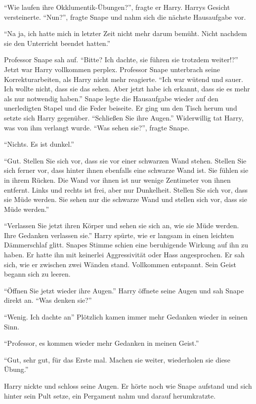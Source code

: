 \enquote{Wie laufen ihre Okklumentik-Übungen?}, fragte er Harry. Harrys Gesicht versteinerte. \enquote{Nun?}, fragte Snape und nahm sich die nächste Hausaufgabe vor.

\enquote{Na ja, ich hatte mich in letzter Zeit nicht mehr darum bemüht. Nicht nachdem sie den Unterricht beendet hatten.}

Professor Snape sah auf. \enquote{Bitte? Ich dachte, sie führen sie trotzdem weiter!?} Jetzt war Harry vollkommen perplex. Professor Snape unterbrach seine Korrekturarbeiten, als Harry nicht mehr reagierte. \enquote{Ich war wütend und sauer. Ich wollte nicht, dass sie das sehen. Aber jetzt habe ich erkannt, dass sie es mehr als nur notwendig haben.} Snape legte die Hausaufgabe wieder auf den unerledigten Stapel und die Feder beiseite. Er ging um den Tisch herum und setzte sich Harry gegenüber. \enquote{Schließen Sie ihre Augen.} Widerwillig tat Harry, was von ihm verlangt wurde. \enquote{Was sehen sie?}, fragte Snape.

\enquote{Nichts. Es ist dunkel.}

\enquote{Gut. Stellen Sie sich vor, dass sie vor einer schwarzen Wand stehen. Stellen Sie sich ferner vor, dass hinter ihnen ebenfalls eine schwarze Wand ist. Sie fühlen sie in ihrem Rücken. Die Wand vor ihnen ist nur wenige Zentimeter von ihnen entfernt. Links und rechts ist frei, aber nur Dunkelheit. Stellen Sie sich vor, dass sie Müde werden. Sie sehen nur die schwarze Wand und stellen sich vor, dass sie Müde werden.}

\enquote{Verlassen Sie jetzt ihren Körper und sehen sie sich an, wie sie Müde werden. Ihre Gedanken verlassen sie.} Harry spürte, wie er langsam in einen leichten Dämmerschlaf glitt. Snapes Stimme schien eine beruhigende Wirkung auf ihn zu haben. Er hatte ihn mit keinerlei Aggressivität oder Hass angesprochen. Er sah sich, wie er zwischen zwei Wänden stand. Vollkommen entspannt. Sein Geist begann sich zu leeren.

\enquote{Öffnen Sie jetzt wieder ihre Augen.} Harry öffnete seine Augen und sah Snape direkt an. \enquote{Was denken sie?}

\enquote{Wenig. Ich dachte an\abs} Plötzlich kamen immer mehr Gedanken wieder in seinen Sinn.

\enquote{Professor, es kommen wieder mehr Gedanken in meinen Geist.}

\enquote{Gut, sehr gut, für das Erste mal. Machen sie weiter, wiederholen sie diese Übung.}

Harry nickte und schloss seine Augen. Er hörte noch wie Snape aufstand und sich hinter sein Pult setze, ein Pergament nahm und darauf herumkratzte.


